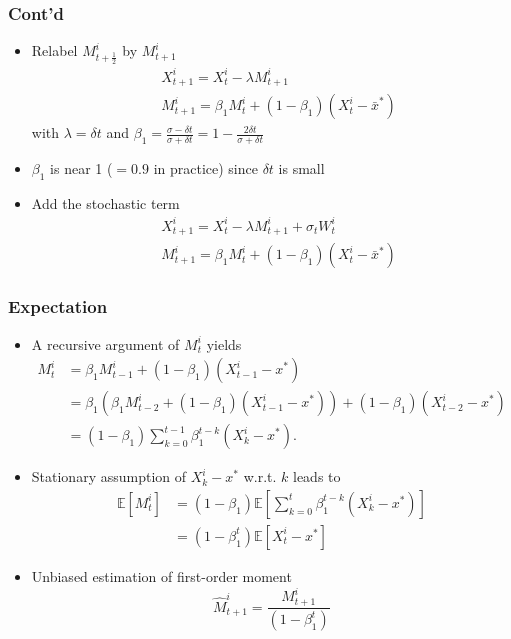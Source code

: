 \documentclass[aspectratio=169]{beamer}
\begin{document}
\begin{frame}
\frametitle{Cont'd}

\begin{itemize}
	\item[] Relabel $M^i_{t+\frac{1}{2}}$ by $M^i_{t+1}$
	\begin{equation*}
	\begin{aligned}
	&X^i_{t+1} = X_t^i - \lambda M^i_{t+1}  \\
	\ &M^i_{t+1} = \beta_1 M^i_{t} + (1-\beta_1) (X_t^i - \bar{x}^*)
	\end{aligned}
	\end{equation*}
	with $\lambda = \delta t $ and $\beta_1 =\frac{\sigma - \delta t}{\sigma+ \delta t} =1 - \frac{2\delta t }{\sigma  + \delta t }  $
	\item[] $\beta_1$ is near 1 ($=0.9$ in practice) since $\delta t$ is small
	\item[] Add the stochastic term
		\begin{equation*}
	\begin{aligned}
	&X^i_{t+1} = X_t^i - \lambda M^i_{t+1} + \sigma_t  W^i_t \\
	\ &M^i_{t+1} = \beta_1 M^i_{t} + (1-\beta_1) (X_t^i - \bar{x}^*)
	\end{aligned}
	\end{equation*}
\end{itemize}

\end{frame}

\begin{frame}
\frametitle{Expectation}

\begin{itemize}
	\item[] A recursive argument of $M_t^i$ yields
	\begin{equation*}
	\begin{aligned}
	M^i_t & = \beta_1 M^i_{t-1} + (1-\beta_1)(X^i_{t-1} - x^*)\\
	& = \beta_1 (\beta_1 M^i_{t-2} + (1-\beta_1) (X_{t-1}^i - x^*)) + (1-\beta_1) (X^i_{t-2} - x^*)\\
	& = (1-\beta_1) \sum_{k=0}^{t-1} \beta_1^{t-k} (X_{k}^i - x^*).
	\end{aligned}
	\end{equation*}
	\item[] Stationary assumption of $X_{k}^i - x^*$ w.r.t. $k$ leads to
	\begin{equation*}
	\begin{aligned}
	\mathbb{E} [M^i_t] & =(1-\beta_1)   \mathbb{E} [\sum_{k=0}^t \beta_1^{t-k} (X_{k}^i - x^*)] \\
	&= (1-\beta_1^t)  \mathbb{E}[ X_{t}^i - x^* ]
	\end{aligned}
	\end{equation*}
	\item[] Unbiased estimation of first-order moment
	\[
	\hat{M}^i_{t+1} = \frac{M^i_{t+1}}{(1-\beta_1^t)}
	\]
	\end{itemize}	

\end{frame}
\end{document}

